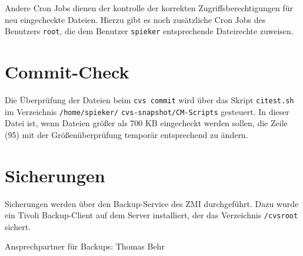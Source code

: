 \documentclass[a4paper, 10pt]{article}
\newcommand{\file}[1]{\texttt{#1}}
\begin{document}
Andere Cron Jobs dienen der kontrolle der korrekten Zugriffsberechtigungen f\"ur
neu eingecheckte Dateien. Hierzu gibt es noch zus\"atzliche Cron Jobs des Benutzers
\file{root}, die dem Benutzer \file{spieker} entsprechende Dateirechte zuweisen.

\section{Commit-Check}
Die \"Uberpr\"ufung der Dateien beim \file{cvs commit} wird \"uber das Skript
\file{citest.sh} im Verzeichnis \file{/home/spieker/} \file{cvs-snapshot/CM-Scripts}
gesteuert. In dieser Datei ist, wenn Dateien gr\"o\ss{}er als
700 KB eingecheckt werden sollen, die Zeile (95) mit der Gr\"o\ss{}en\"uberpr\"ufung
tempor\"ar entsprechend zu \"andern.

\section{Sicherungen}
Sicherungen werden \"uber den Backup-Service des ZMI durchgef\"uhrt. Dazu
wurde ein Tivoli Backup-Client auf dem Server installiert, der das Verzeichnis
\file{/cvsroot} sichert.

Ansprechpartner f\"ur Backups: Thomas Behr
\end{document}

